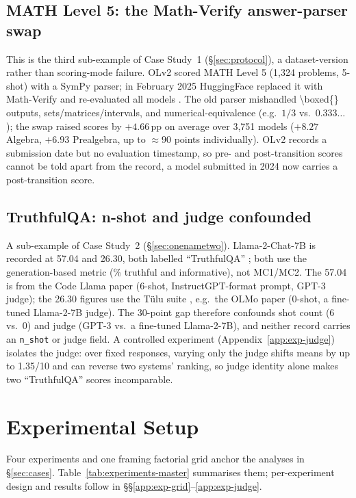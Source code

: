 \documentclass[11pt]{article}
\begin{document}
\subsection{MATH Level 5: the Math-Verify answer-parser swap}
\label{sec:math}
This is the third sub-example of Case Study~1 (\S\ref{sec:protocol}), a
dataset-version rather than scoring-mode failure. OLv2 scored MATH Level 5
(1{,}324 problems, 5-shot) with a SymPy parser; in February 2025 HuggingFace
replaced it with Math-Verify and re-evaluated all models
\citep{kydlicek2025mathverify}. The old parser mishandled
\textbackslash{}boxed\{\} outputs, sets/matrices/intervals, and
numerical-equivalence (e.g.\ $1/3$ vs.\ $0.333\ldots$); the swap raised scores
by $+4.66$\,pp on average over 3{,}751 models ($+8.27$ Algebra, $+6.93$
Prealgebra, up to ${\approx}90$ points individually). OLv2 records a submission
date but no evaluation timestamp, so pre- and post-transition scores cannot be
told apart from the record, a model submitted in 2024 now carries a
post-transition score.

\subsection{TruthfulQA: n-shot and judge confounded}
\label{sec:truthfulqa}
A sub-example of Case Study~2 (\S\ref{sec:onenametwo}). Llama-2-Chat-7B is recorded
at 57.04 and 26.30, both labelled ``TruthfulQA'' \citep{lin2022truthfulqa}; both
use the generation-based metric (\% truthful and informative), not MC1/MC2. The
57.04 is from the Code Llama paper \citep{roziere2023codellama} (6-shot,
InstructGPT-format prompt, GPT-3 judge); the 26.30 figures use the T\"ulu suite
\citep{ivison2023camels}, e.g.\ the OLMo paper \citep{groeneveld2024olmo} (0-shot,
a fine-tuned Llama-2-7B judge). The 30-point gap therefore confounds shot count
(6 vs.\ 0) and judge (GPT-3 vs.\ a fine-tuned Llama-2-7B), and neither record
carries an \texttt{n\_shot} or judge field. A controlled experiment
(Appendix~\ref{app:exp-judge}) isolates the judge: over fixed responses, varying
only the judge shifts means by up to 1.35/10 and can reverse two systems' ranking,
so judge identity alone makes two ``TruthfulQA'' scores incomparable.
\FloatBarrier
\section{Experimental Setup}
\label{app:experiments}

Four experiments and one framing factorial grid anchor the analyses in
\S\ref{sec:cases}. Table~\ref{tab:experiments-master} summarises them;
per-experiment design and results follow in
\S\S\ref{app:exp-grid}--\ref{app:exp-judge}.
\end{document}

